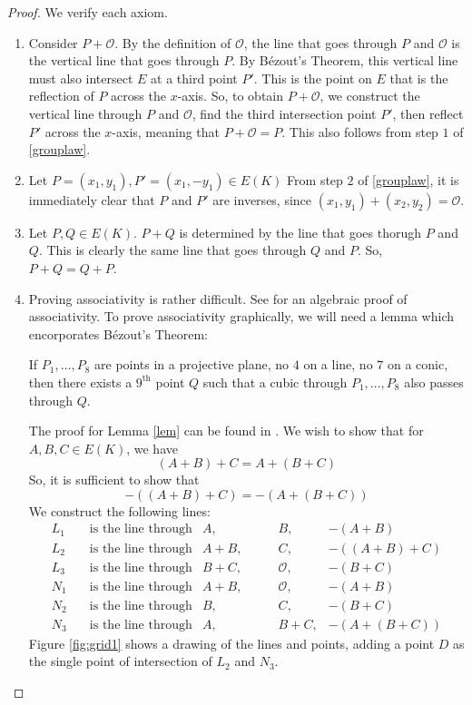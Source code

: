 \documentclass[]{math_paper}
\begin{document}
\begin{proof} We verify each axiom.
    \begin{enumerate} [label = (\roman*)]
        \item Consider $P + \mathcal{O}$. By the definition of $\mathcal{O}$, the line that goes through $P$ and $\mathcal{O}$ is the vertical line that goes through $P$. By Bézout's Theorem, this vertical line must also intersect $E$ at a third point $P'$. This is the point on $E$ that is the reflection of $P$ across the $x$-axis. So, to obtain $P + \mathcal{O}$, we construct the vertical line through $P$ and $\mathcal{O}$, find the third intersection point $P'$, then reflect $P'$ across the $x$-axis, meaning that $P + \mathcal{O} = P.$ This also follows from step $1$ of \ref{grouplaw}.
        \item Let $P = (x_1, y_1), P' = (x_1, -y_1) \in E(K)$ From step $2$ of \ref{grouplaw}, it is immediately clear that $P$ and $P'$ are inverses, since $(x_1, y_1) + (x_2, y_2) = \mathcal{O}$.
        \item Let $P, Q \in E(K)$. $P + Q$ is determined by the line that goes thorugh $P$ and $Q$. This is clearly the same line that goes through $Q$ and $P$. So, $P + Q = Q + P$.
        \item Proving associativity is rather difficult. See \cite{fujii} for an algebraic proof of associativity. To prove associativity graphically, we will need a lemma which encorporates Bézout's Theorem:
              \begin{lemma} \label{lem}
                  If $P_1, \ldots, P_8$ are points in a projective plane, no $4$ on a line, no $7$ on a conic, then there exists a $9^{\text{th}}$ point $Q$ such that a cubic through $P_1, \ldots, P_8$ also passes through $Q$.
              \end{lemma}
              The proof for Lemma \ref{lem} can be found in \cite{cassels_1991}. We wish to show that for $A, B, C \in E(K)$, we have $$(A + B) + C = A + (B + C)$$
              So, it is sufficient to show that
              $$-((A + B) + C ) = -(A + (B + C))$$
              We construct the following lines:
              \begin{align*}
                  L_1 & \quad \text{is the line through}  & A,\qquad      & B,           & -(A + B)       \\
                  L_2 & \quad \text{is the line through}  & A + B, \qquad & C,           & -((A + B) + C) \\
                  L_3 & \quad  \text{is the line through} & B + C, \qquad & \mathcal{O}, & -(B + C)       \\
                  N_1 & \quad \text{is the line through}  & A + B,\qquad  & \mathcal{O}, & -(A + B)       \\
                  N_2 & \quad \text{is the line through}  & B, \qquad     & C,           & -(B + C)       \\
                  N_3 & \quad \text{is the line through}  & A, \qquad     & B+C,         & -(A + (B + C))
              \end{align*}
              Figure \ref{fig:grid1} shows a drawing of the lines and points, adding a point $D$ as the single point of intersection of $L_2$ and $N_3$.


\end{enumerate}
\end{proof}
\end{document}
